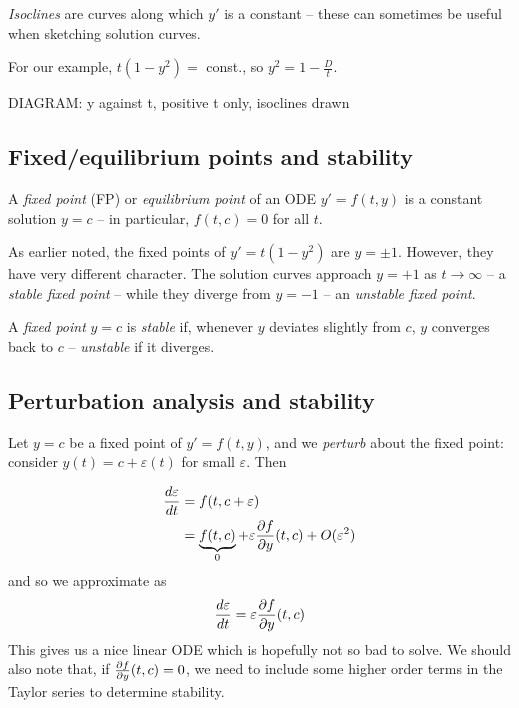 \documentclass{../template/note}
\begin{document}
    \begin{definition}[Isoclines]
        \emph{Isoclines} are curves along which \(y'\) is a constant -- these can sometimes be useful when sketching solution curves.
    \end{definition}
    
    \begin{example}
        For our example, \(t(1-y^2)=\) const., so \(y^2 = 1 - \frac{D}{t}\).

        DIAGRAM: y against t, positive t only, isoclines drawn
    \end{example}
    
    \subsection{Fixed/equilibrium points and stability}

    \begin{definition}
        A \emph{fixed point} (FP) or \emph{equilibrium point} of an ODE \(y' = f(t, y)\) is a constant solution \(y=c\) -- in particular, \(f(t, c) = 0\) for all \(t\).
    \end{definition}
    
    \begin{example}
        As earlier noted, the fixed points of \(y' = t(1-y^2)\) are \(y = \pm 1\). However, they have very different character. The solution curves approach \(y=+1\) as \(t \to \infty\) -- a \emph{stable fixed point} -- while they diverge from \(y=-1\) -- an \emph{unstable fixed point}.
    \end{example}
    
    \begin{definition}
        A \emph{fixed point} \(y=c\) is \emph{stable} if, whenever \(y\) deviates slightly from \(c\), \(y\) converges back to \(c\) -- \emph{unstable} if it diverges.
    \end{definition}
    
    \subsection{Perturbation analysis and stability}

    Let \(y=c\) be a fixed point of \(y' = f(t, y)\), and we \emph{perturb} about the fixed point: consider \(y(t) = c + \varepsilon(t)\) for small \(\varepsilon\). Then

    \begin{align*}
        \frac{d\varepsilon}{dt} &= f(t, c + \varepsilon) \\
        &= \underbrace{f(t, c)}_0 + \varepsilon \pd{f}{y}(t, c) + O(\varepsilon^2)
    \end{align*}
    and so we approximate as
    \[
        \frac{d\varepsilon}{dt} = \varepsilon \pd{f}{y}(t,c)
    \]
    This gives us a nice linear ODE which is hopefully not so bad to solve. We should also note that, if \(\pd{f}{y}(t, c) = 0\), we need to include some higher order terms in the Taylor series to determine stability.
\end{document}
